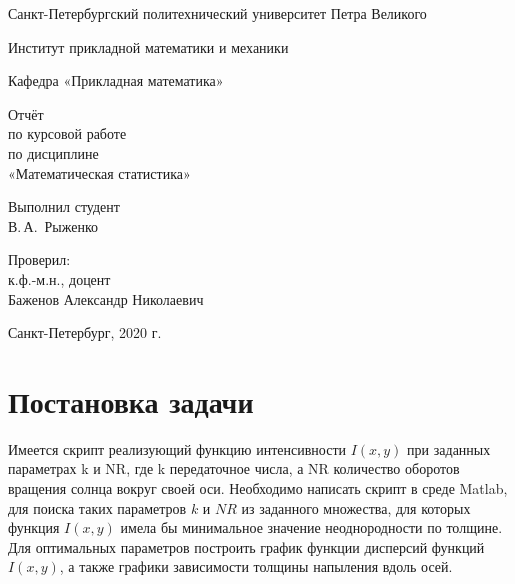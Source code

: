\documentclass[12pt,a4paper]{scrartcl}
\begin{document}
\begin{titlepage}
  \begin{center}

    Санкт-Петербургский политехнический университет Петра Великого

    \vspace{0.25cm}
    
    Институт прикладной математики и механики
    
    Кафедра «Прикладная математика»
    \vfill

	\vspace{0.25cm}
	    Отчёт\\
	по курсовой работе\\
	по дисциплине\\
	«Математическая статистика»

  \bigskip

\end{center}
\vfill

\newlength{\ML}
\hfill\begin{minipage}{0.4\textwidth}
  Выполнил студент\\ В.\,А.~Рыженко\\
\end{minipage}%
\bigskip

\hfill\begin{minipage}{0.4\textwidth}
  Проверил:\\
к.ф.-м.н., доцент\\
Баженов Александр Николаевич\\
\end{minipage}%
\vfill

\begin{center}
  Санкт-Петербург, 2020 г.
\end{center}
\end{titlepage}

\tableofcontents
\listoffigures
\newpage

\section{Постановка задачи}
 
Имеется скрипт реализующий функцию интенсивности $I(x, y)$ при заданных параметрах k и NR, где k передаточное числа, а NR количество оборотов вращения солнца вокруг своей оси.
Необходимо написать скрипт в среде Matlab, для поиска таких параметров $k$ и $NR$ из заданного множества, для которых функция $I(x, y)$ имела бы минимальное значение неоднородности по толщине.
Для оптимальных параметров построить график функции дисперсий функций $I(x, y)$, а также графики зависимости толщины напыления вдоль осей.
\end{document}
